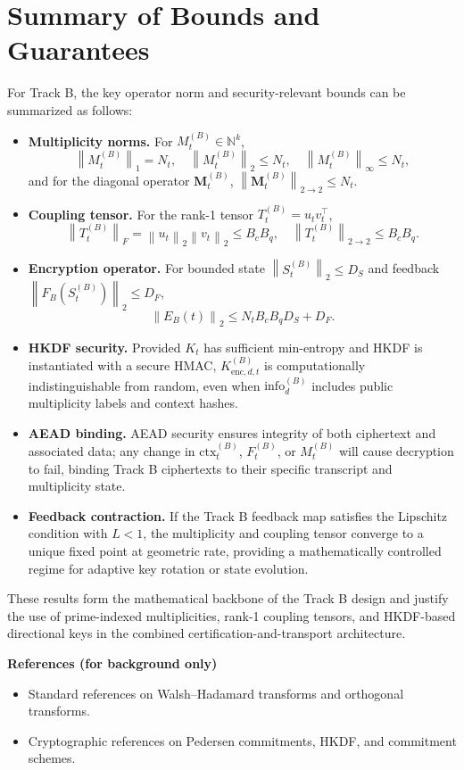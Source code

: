 \documentclass[11pt]{article}
\newcommand{\N}{\mathbb{N}}
\newcommand{\norm}[1]{\left\lVert #1 \right\rVert}
\begin{document}
\section{Summary of Bounds and Guarantees}

For Track B, the key operator norm and security-relevant bounds can be summarized as follows:

\begin{itemize}
  \item \textbf{Multiplicity norms.}
  For \(M_t^{(B)} \in \N^k\),
  \[
    \norm{M_t^{(B)}}_1 = N_t, \quad
    \norm{M_t^{(B)}}_2 \le N_t, \quad
    \norm{M_t^{(B)}}_\infty \le N_t,
  \]
  and for the diagonal operator \(\mathbf{M}_t^{(B)}\),
  \(\norm{\mathbf{M}_t^{(B)}}_{2\to2} \le N_t\).
  \item \textbf{Coupling tensor.}
  For the rank-1 tensor \(T_t^{(B)} = u_t v_t^\top\),
  \[
    \norm{T_t^{(B)}}_F = \norm{u_t}_2 \norm{v_t}_2 \le B_c B_q, \quad
    \norm{T_t^{(B)}}_{2\to2} \le B_c B_q.
  \]
  \item \textbf{Encryption operator.}
  For bounded state \(\norm{S_t^{(B)}}_2 \le D_S\) and feedback \(\norm{F_B(S_t^{(B)})}_2 \le D_F\),
  \[
    \norm{E_B(t)}_2 \le N_t B_c B_q D_S + D_F.
  \]
  \item \textbf{HKDF security.}
  Provided \(K_t\) has sufficient min-entropy and HKDF is instantiated with a secure HMAC, \(K_{\mathrm{enc},d,t}^{(B)}\) is computationally indistinguishable from random, even when \(\mathrm{info}_d^{(B)}\) includes public multiplicity labels and context hashes.\cite{HKDFWiki,GopherHKDF}
  \item \textbf{AEAD binding.}
  AEAD security ensures integrity of both ciphertext and associated data; any change in \(\mathrm{ctx}_t^{(B)}\), \(F_t^{(B)}\), or \(M_t^{(B)}\) will cause decryption to fail, binding Track B ciphertexts to their specific transcript and multiplicity state.
  \item \textbf{Feedback contraction.}
  If the Track B feedback map satisfies the Lipschitz condition with \(L<1\), the multiplicity and coupling tensor converge to a unique fixed point at geometric rate, providing a mathematically controlled regime for adaptive key rotation or state evolution.
\end{itemize}

These results form the mathematical backbone of the Track B design and justify the use of prime-indexed multiplicities, rank-1 coupling tensors, and HKDF-based directional keys in the combined certification-and-transport architecture.

\vspace{1em}
\noindent\textbf{References (for background only)}
\begin{itemize}
  \item Standard references on Walsh--Hadamard transforms and orthogonal transforms.\cite{WHTOverview,WHTOrthogonal}
  \item Cryptographic references on Pedersen commitments, HKDF, and commitment schemes.\cite{PedersenZKDocs,PedersenRareSkills,CommitmentSchemeWiki,HKDFWiki,GopherHKDF}
\end{itemize}

\nocite{*}
  
  
\end{document}
